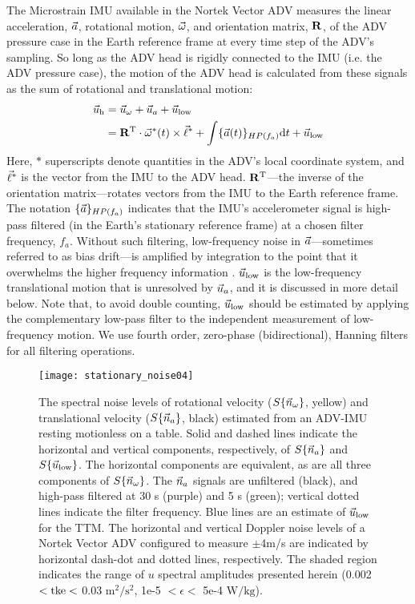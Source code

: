 The Microstrain IMU available in the Nortek Vector ADV measures the linear acceleration, ${\vec{a}}$, rotational motion, $\vec{\omega}$, and orientation matrix, $\mathbf{R}$, of the ADV pressure case in the Earth reference frame at every time step of the ADV's sampling. So long as the ADV head is rigidly connected to the IMU (i.e. the ADV pressure case), the motion of the ADV head is calculated from these signals as the sum of rotational and translational motion:
\begin{align}
  \label{eqn:uhead}
\begin{split}
  \vec{u}_\mathrm{h} & = \vec{u}_\omega + \vec{u}_a + \vec{u}_\mathrm{low} \\
      & = \mathbf{R}^\mathrm{T} \cdot \vec{\omega}^*(t)\times\vec{\ell}^* + \int \{{\vec{a}}(t)\}_{HP(f_{a})} \mathrm{d}t + \vec{u}_\mathrm{low}
\end{split}
\end{align}
Here, $*$ superscripts denote quantities in the ADV's local coordinate system, and $\vec{\ell}^*$ is the vector from the IMU to the ADV head. $\mathbf{R}^\mathrm{T}$---the inverse of the orientation matrix---rotates vectors from the IMU to the Earth reference frame. The notation $\{{\vec{a}}\}_{HP(f_a)}$ indicates that the IMU's accelerometer signal is high-pass filtered (in the Earth's stationary reference frame) at a chosen filter frequency, $f_a$. Without such filtering, low-frequency noise in ${\vec{a}}$---sometimes referred to as bias drift---is amplified by integration to the point that it overwhelms the higher frequency information \cite[]{Barshan+Whyte1995, Bevly2004, Gulmammadov2009}. $\vec{u}_\mathrm{low}$ is the low-frequency translational motion that is unresolved by $\vec{u}_a$, and it is discussed in more detail below. Note that, to avoid double counting, $\vec{u}_\mathrm{low}$ should be estimated by applying the complementary low-pass filter to the independent measurement of low-frequency motion. We use fourth order, zero-phase (bidirectional), Hanning filters for all filtering operations.

\begin{figure}
  \centering
  \texttt{[image: stationary\_noise04]}
  \caption{The spectral noise levels of rotational velocity ($S\{\vec{n}_{\omega}\}$, yellow) and translational velocity ($S\{\vec{n}_{a}\}$, black) estimated from an ADV-IMU resting motionless on a table. Solid and dashed lines indicate the horizontal and vertical components, respectively, of $S\{\vec{n}_{a}\}$ and $S\{\vec{u}_\mathrm{low}\}$. The horizontal components are equivalent, as are all three components of $S\{\vec{n}_{\omega}\}$. The $\vec{n}_{a}$ signals are unfiltered (black), and high-pass filtered at 30 s (purple) and 5 s (green); vertical dotted lines indicate the filter frequency.  Blue lines are an estimate of $\vec{u}_\mathrm{low}$ for the TTM. The horizontal and vertical Doppler noise levels of a Nortek Vector ADV configured to measure $\pm$4m/s are indicated by horizontal dash-dot and dotted lines, respectively. The shaded region indicates the range of $u$ spectral amplitudes presented herein (0.002 $< \mathrm{tke} <$ 0.03 $\mathrm{m^2/s^2}$, 1e-5 $< \epsilon <$ 5e-4 $\mathrm{W/kg}$).}
  \label{fig:stnoise}
\end{figure}

